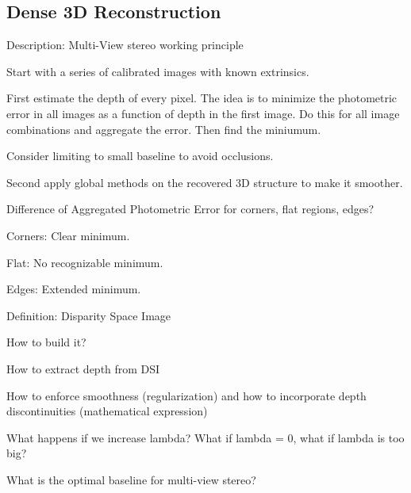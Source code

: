 \documentclass[10pt,a4paper]{scrartcl}
\begin{document}
\begin{multicols*}{2}
\subsection*{Dense 3D Reconstruction}

\begin{QandA}
{Description: Multi-View stereo working principle}
\item Start with a series of calibrated images with known extrinsics.
\item First estimate the depth of every pixel. The idea is to minimize the photometric error in all images as a function of depth in the first image. Do this for all image combinations and aggregate the error. Then find the miniumum.
\item Consider limiting to small baseline to avoid occlusions.
\item Second apply global methods on the recovered 3D structure to make it smoother.
\end{QandA}

\begin{QandA}
{Difference of Aggregated Photometric Error for corners, flat regions, edges?}
\item Corners: Clear minimum.
\item Flat: No recognizable minimum.
\item Edges: Extended minimum.
\end{QandA}

\begin{QandA}
{Definition: Disparity Space Image}
\item How to build it?
\end{QandA}

\begin{QandA}
{How to extract depth from DSI}
\item
\end{QandA}

\begin{QandA}
{How to enforce smoothness (regularization) and how to incorporate depth discontinuities (mathematical expression)}
\item
\end{QandA}

\begin{QandA}
{What happens if we increase lambda? What if lambda = 0, what if lambda is too big?}
\item
\end{QandA}

\begin{QandA}
{What is the optimal baseline for multi-view stereo?}
\item
\end{QandA}


\end{multicols*}
\end{document}
